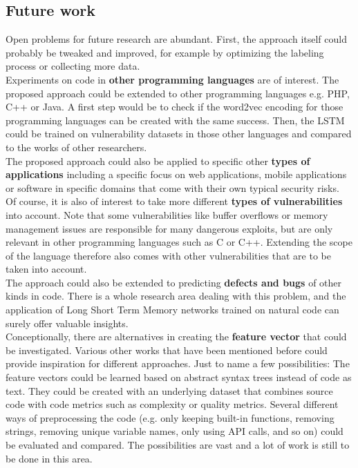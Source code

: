 \documentclass[
a4paper,
pagesize,
pdftex,
12pt,
twoside, %
BCOR=5mm, %
ngerman,
fleqn,
final,
]{scrartcl}
\begin{document}
	\subsection{Future work}
	Open problems for future research are abundant. First, the approach itself could probably be tweaked and improved, for example by optimizing the labeling process or collecting more data.\\
	Experiments on code in \textbf{other programming languages} are of interest. The proposed approach could be extended to other programming languages e.g. PHP, C++ or Java. A first step would be to check if the word2vec encoding for those programming languages can be created with the same success. Then, the LSTM could be trained on vulnerability datasets in those other languages and compared to the works of other researchers. \\
	The proposed approach could also be applied to specific other \textbf{types of applications} including a specific focus on web applications, mobile applications or software in specific domains that come with their own typical security risks.\\
	Of course, it is also of interest to take more different \textbf{types of vulnerabilities} into account. Note that some vulnerabilities like buffer overflows or memory management issues are responsible for many dangerous exploits, but are only relevant in other programming languages such as C or C++. Extending the scope of the language therefore also comes with other vulnerabilities that are to be taken into account.\\
	The approach could also be extended to predicting \textbf{defects and bugs} of other kinds in code. There is a whole research area dealing with this problem, and the application of Long Short Term Memory networks trained on natural code can surely offer valuable insights.\\
	Conceptionally, there are alternatives in creating the \textbf{feature vector} that could be investigated. Various other works that have been mentioned before could provide inspiration for different approaches. Just to name a few possibilities: The feature vectors could be learned based on abstract syntax trees instead of code as text. They could be created with an underlying dataset that combines source code with code metrics such as complexity or quality metrics. Several different ways of preprocessing the code (e.g. only keeping built-in functions, removing strings, removing unique variable names, only using API calls, and so on) could be evaluated and compared. The possibilities are vast and a lot of work is still to be done in this area.\\
\end{document}
